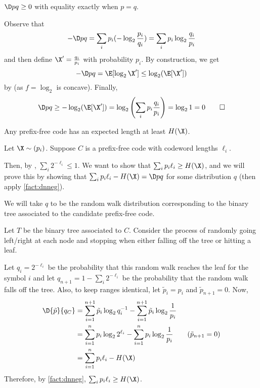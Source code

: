 \documentclass[class=co432,notes,tikz]{agony}
\begin{document}
\begin{fact}\label{fact:dnneg}
  $\D p q \geq 0$ with equality exactly when $p = q$.
\end{fact}
\begin{prf}
  Observe that
  \[ -\D p q = \sum_i p_i(-\log_2\frac{p_i}{q_i}) = \sum_i p_i \log_2 \frac{q_i}{p_i} \]
  and then define $\X' = \frac{q_i}{p_i}$ with probability $p_i$.
  By construction, we get
  \[ -\D p q = \E[\log_2 \X'] \leq \log_2(\E[\X']) \]
  by  (as $f = \log_2$ is concave).
  Finally,
  \[ \D p q \geq -\log_2(\E[\X']) = \log_2\qty(\sum_i p_i \frac{q_i}{p_i}) = \log_2 1 = 0  \qedhere \]
\end{prf}

\begin{prop}
  Any prefix-free code has an expected length at least $H(\X)$.
\end{prop}
\begin{prf}
  Let $\X \sim (p_i)$.
  Suppose $C$ is a prefix-free code with codeword lengths $\ell_i$.

  Then, by , $\sum_i 2^{-\ell_i} \leq 1$.
  We want to show that $\sum_i p_i \ell_i \geq H(\X)$,
  and we will prove this by showing that $\sum_i p_i \ell_i - H(\X) =
    \D p q$ for some distribution $q$
  (then apply \cref{fact:dnneg}).

  We will take $q$ to be the random walk distribution corresponding to the binary tree
  associated to the candidate prefix-free code.

  Let $T$ be the binary tree associated to $C$.
  Consider the process of randomly going left/right at each node
  and stopping when either falling off the tree or hitting a leaf.

  Let $q_i = 2^{-\ell_i}$ be the probability that this random walk reaches the leaf for the symbol $i$
  and let $q_{n+1} = 1-\sum_i 2^{-\ell_i}$ be the probability that the random walk falls off the tree.
  Also, to keep ranges identical, let $\tilde p_i = p_i$ and $\tilde p_{n+1} = 0$. Now,
  \begin{align*}
    \D{\tilde p}{q_C}
     & = \sum_{i=1}^{n+1} \tilde p_i \log_2 q_i^{-1} - \sum_{i=1}^{n+1} \tilde p_i \log_2 \frac{1}{p_i}      \\
     & = \sum_{i=1}^n p_i \log_2 2^{\ell_i} - \sum_{i=1}^n p_i \log_2 \frac{1}{p_i} \tag{$\tilde p_{n+1}=0$} \\
     & = \sum_{i=1}^n p_i \ell_i - H(\X)
  \end{align*}
  Therefore, by \cref{fact:dnneg}, $\sum_i p_i \ell_i \geq H(\X)$.
\end{prf}
\end{document}

